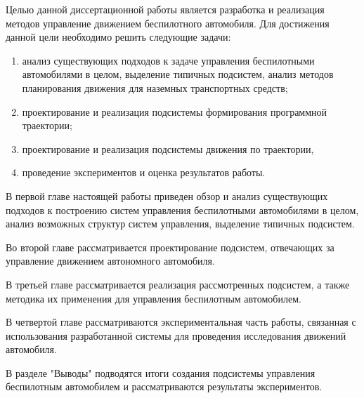 Целью данной диссертационной работы является разработка и реализация методов управление движением беспилотного
автомобиля. Для достижения данной цели необходимо решить следующие задачи:

\begin{enumerate}
    \item анализ существующих подходов к задаче управления беспилотными автомобилями в целом, выделение
          типичных подсистем, анализ методов планирования движения для наземных транспортных средств;
    \item проектирование и реализация подсистемы формирования программной траектории;
    \item проектирование и реализация подсистемы движения по траектории,
    \item проведение экспериментов и оценка результатов работы.
\end{enumerate}

В первой главе настоящей работы приведен обзор и анализ существующих подходов к построению систем управления
беспилотными автомобилями в целом, анализ возможных структур систем управления, выделение типичных подсистем.

Во второй главе рассматривается проектирование подсистем, отвечающих за управление движением автономного
автомобиля.

В третьей главе рассматривается реализация рассмотренных подсистем, а также методика их применения для управления
беспилотным автомобилем.

В четвертой главе рассматриваются экспериментальная часть работы, связанная с использования разработанной системы
для проведения исследования движений автомобиля.

В разделе "Выводы" подводятся итоги создания подсистемы управления беспилотным автомобилем и рассматриваются
результаты экспериментов.
